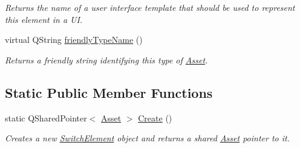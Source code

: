 \begin{DoxyCompactItemize}
\begin{DoxyCompactList}\small\item\em Returns the name of a user interface template that should be used to represent this element in a U\-I. \end{DoxyCompactList}\item 
virtual Q\-String \hyperlink{class_picto_1_1_switch_element_a8541f08fab2a26c8ee4edce5a9abe3f1}{friendly\-Type\-Name} ()
\begin{DoxyCompactList}\small\item\em Returns a friendly string identifying this type of \hyperlink{class_picto_1_1_asset}{Asset}. \end{DoxyCompactList}\end{DoxyCompactItemize}
\subsection*{Static Public Member Functions}
\begin{DoxyCompactItemize}
\item 
\hypertarget{class_picto_1_1_switch_element_a2df72a725f9217da6862c629a930ea10}{static Q\-Shared\-Pointer$<$ \hyperlink{class_picto_1_1_asset}{Asset} $>$ \hyperlink{class_picto_1_1_switch_element_a2df72a725f9217da6862c629a930ea10}{Create} ()}\label{class_picto_1_1_switch_element_a2df72a725f9217da6862c629a930ea10}

\begin{DoxyCompactList}\small\item\em Creates a new \hyperlink{class_picto_1_1_switch_element}{Switch\-Element} object and returns a shared \hyperlink{class_picto_1_1_asset}{Asset} pointer to it. \end{DoxyCompactList}\end{DoxyCompactItemize}
